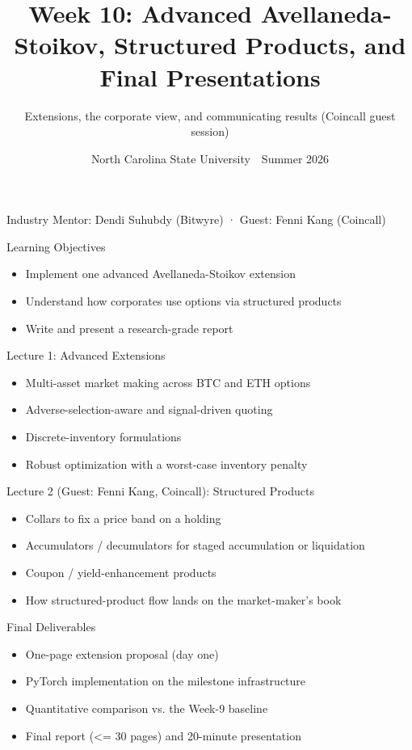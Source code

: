 \documentclass[aspectratio=169,11pt]{beamer}
\title{Week 10: Advanced Avellaneda-Stoikov, Structured Products, and Final Presentations}
\subtitle{Extensions, the corporate view, and communicating results (Coincall guest session)}
\date{North Carolina State University \,\textbar\, Summer 2026}
\begin{document}
\begin{frame}[plain]\titlepage
\begin{center}\tiny Industry Mentor: Dendi Suhubdy (Bitwyre)  ·  Guest: Fenni Kang (Coincall)\end{center}\end{frame}
\begin{frame}{Learning Objectives}
\begin{itemize}
  \item Implement one advanced Avellaneda-Stoikov extension
  \item Understand how corporates use options via structured products
  \item Write and present a research-grade report
\end{itemize}\end{frame}
\begin{frame}{Lecture 1: Advanced Extensions}
\begin{itemize}
  \item Multi-asset market making across BTC and ETH options
  \item Adverse-selection-aware and signal-driven quoting
  \item Discrete-inventory formulations
  \item Robust optimization with a worst-case inventory penalty
\end{itemize}\end{frame}
\begin{frame}{Lecture 2 (Guest: Fenni Kang, Coincall): Structured Products}
\begin{itemize}
  \item Collars to fix a price band on a holding
  \item Accumulators / decumulators for staged accumulation or liquidation
  \item Coupon / yield-enhancement products
  \item How structured-product flow lands on the market-maker's book
\end{itemize}\end{frame}
\begin{frame}{Final Deliverables}
\begin{itemize}
  \item One-page extension proposal (day one)
  \item PyTorch implementation on the milestone infrastructure
  \item Quantitative comparison vs. the Week-9 baseline
  \item Final report (\textless{}= 30 pages) and 20-minute presentation
\end{itemize}\end{frame}
\end{document}
